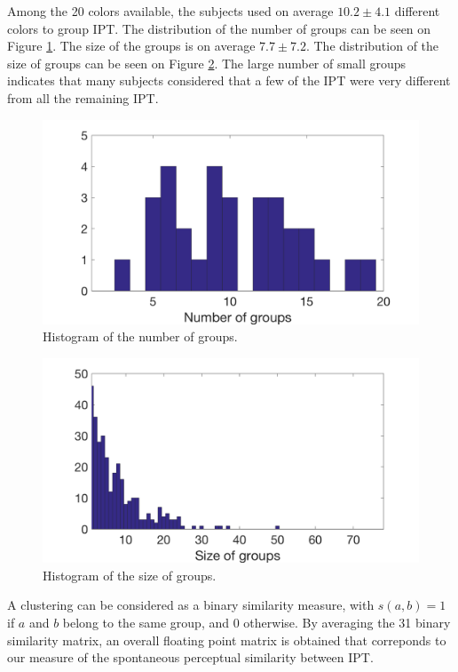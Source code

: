 \documentclass{article}
\newcommand{\ipt}{IPT\xspace}
\begin{document}
Among the 20 colors available, the subjects used on average $10.2 \pm  4.1$ different colors to group \ipt. The distribution of the number of groups can be seen on Figure \ref{fig:xp2nbGroup}. The size of the groups is on average $7.7 \pm   7.2$. The distribution of the size of groups can be seen on Figure \ref{fig:xp2sizeGroup}. The large number of small groups indicates that many subjects considered that a few of the \ipt were very different from all the remaining \ipt.

\begin{figure}
\center
\includegraphics[width = \textwidth]{figures/nbc.png}
\caption{Histogram of the number of groups.}
\label{fig:xp2nbGroup}
\end{figure}

\begin{figure}
\center
\includegraphics[width = \textwidth]{figures/sbc.png}
\caption{Histogram of the size of groups.}
\label{fig:xp2sizeGroup}
\end{figure}

A clustering can be considered as a binary similarity measure, with $s(a, b) = 1$ if $a$ and $b$ belong to the same group, and $0$ otherwise. By averaging the 31 binary similarity matrix, an overall floating point matrix is obtained that correponds to our measure of the spontaneous perceptual similarity between \ipt.
\end{document}
